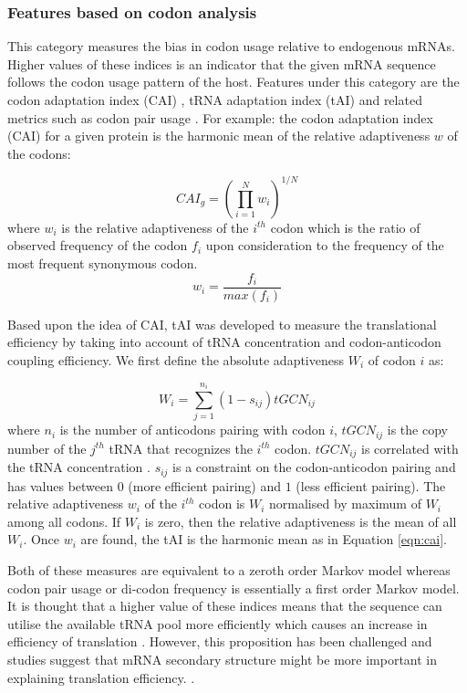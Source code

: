 

\subsubsection{Features based on codon analysis}
This category measures the bias in codon usage relative  to endogenous mRNAs. Higher values of these indices is an indicator that the given mRNA sequence follows the codon usage pattern of the host. Features under this category are the codon adaptation index (CAI) \cite{Sharp1987-ed}, tRNA adaptation index (tAI) \cite{ Reis2004-dl, Sabi2014-je} and related metrics such as codon pair usage \cite{Gutman1989-pn}. For example: the codon adaptation index (CAI) for a given protein is the harmonic mean of the relative adaptiveness $w$ \cite{Sharp1987-ed} of the codons:

\begin{equation}
    CAI_{g}=(\prod_{i=1}^{N} w_i)^{1/N}
    \label{eqn:cai}
\end{equation}
where $w_i$ is the relative adaptiveness of the $i^{th}$ codon which is the ratio of observed frequency of the codon $f_i$ upon consideration to the frequency of the most frequent synonymous codon. $$w_i = \frac{f_i}{max(f_i)}$$ 

Based upon the idea of CAI, tAI was developed to measure the translational efficiency by taking into account of tRNA concentration and codon-anticodon coupling efficiency. We first define the absolute adaptiveness $W_i$ of codon $i$ as:

\begin{equation}
    W_i = \sum_{j=1}^{n_i} (1 - s_{ij})tGCN_{ij}
\end{equation}
where $n_i$ is the number of anticodons pairing with codon $i$, $tGCN_{ij}$ is the copy number of the $j^{th}$ tRNA that recognizes the $i^{th}$ codon. $tGCN_{ij}$ is correlated with the tRNA concentration \cite{kanaya1999studies, }. $s_{ij}$ is a constraint on the codon-anticodon pairing and has values between $0$ (more efficient pairing) and $1$ (less efficient pairing). The relative adaptiveness $w_i$ of the $i^{th}$ codon is  $W_i$ normalised by maximum of $W_i$ among all codons. If $W_i$ is zero, then the relative adaptiveness is the mean of all $W_i$. Once $w_i$ are found, the tAI is the harmonic mean as in Equation \ref{eqn:cai}. 


Both of these measures are equivalent to a zeroth order Markov model whereas codon pair usage or di-codon frequency is essentially a first order Markov model. It is thought that a higher value of these indices means that the sequence can utilise the available tRNA pool more efficiently which causes an increase in efficiency of translation \cite{ikemura1985codon, Gutman1989-pn, Sharp1987-ed, Reis2004-dl, Sabi2014-je, Brule2017-mx}. However, this proposition has been challenged and studies suggest that mRNA secondary structure might be more important in explaining translation efficiency.  \cite{Kudla2009-tl, Boel2016-jd, Cambray2018-kn}.